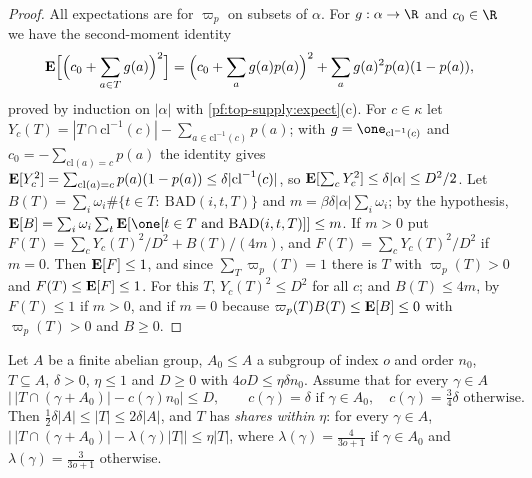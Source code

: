 \begin{proof}
All expectations are for $\varpi_p$ on subsets of $\alpha$. For $g:\alpha\to\R$ and $c_0\in\R$ we have the second-moment
identity
\[
\mathbf{E}\Big[\Big(c_0+\sum_{a\in T}g(a)\Big)^2\Big]=\Big(c_0+\sum_ag(a)p(a)\Big)^2+\sum_ag(a)^2p(a)(1-p(a)),
\]
proved by induction on $|\alpha|$ with \cref{pf:top-supply:expect}(c). For $c\in\kappa$ let
$Y_c(T)=|T\cap\mathrm{cl}^{-1}(c)|-\sum_{a\in\mathrm{cl}^{-1}(c)}p(a)$; with $g=\one_{\mathrm{cl}^{-1}(c)}$ and
$c_0=-\sum_{\mathrm{cl}(a)=c}p(a)$ the identity gives
$\mathbf{E}[Y_c^2]=\sum_{\mathrm{cl}(a)=c}p(a)(1-p(a))\le\delta|\mathrm{cl}^{-1}(c)|$, so
$\mathbf{E}[\sum_cY_c^2]\le\delta|\alpha|\le D^2/2$. Let $B(T)=\sum_i\omega_i\#\{t\in T:\ \mathrm{BAD}(i,t,T)\}$ and
$m=\beta\delta|\alpha|\sum_i\omega_i$; by the hypothesis, $\topsupplyE[B]=\sum_i\omega_i\sum_t\topsupplyE[\one[t\in T\text{ and }
\mathrm{BAD}(i,t,T)]]\le m$. If $m>0$ put $F(T)=\sum_cY_c(T)^2/D^2+B(T)/(4m)$, and $F(T)=\sum_cY_c(T)^2/D^2$ if $m=0$. Then
$\mathbf{E}[F]\le1$, and since $\sum_T\varpi_p(T)=1$ there is $T$ with $\varpi_p(T)>0$ and $F(T)\le\mathbf{E}[F]\le1$. For
this $T$, $Y_c(T)^2\le D^2$ for all $c$; and $B(T)\le4m$, by $F(T)\le1$ if $m>0$, and if $m=0$ because
$\varpi_p(T)B(T)\le\mathbf{E}[B]\le0$ with $\varpi_p(T)>0$ and $B\ge0$.
\end{proof}

\begin{lemma}\label{pf:top-supply:shares}
Let $A$ be a finite abelian group, $A_0\le A$ a subgroup of index $o$ and order $n_0$, $T\subseteq A$, $\delta>0$,
$\eta\le1$ and $D\ge0$ with $4oD\le\eta\delta n_0$. Assume that for every $\gamma\in A$
\[
\big|\,|T\cap(\gamma+A_0)|-c(\gamma)n_0\big|\le D,\qquad c(\gamma)=\delta\text{ if }\gamma\in A_0,\quad
c(\gamma)=\tfrac34\delta\text{ otherwise}.
\]
Then $\frac12\delta|A|\le|T|\le2\delta|A|$, and $T$ has \emph{shares within $\eta$}: for every $\gamma\in A$,
$\big|\,|T\cap(\gamma+A_0)|-\lambda(\gamma)|T|\big|\le\eta|T|$, where $\lambda(\gamma)=\frac4{3o+1}$ if $\gamma\in A_0$ and
$\lambda(\gamma)=\frac3{3o+1}$ otherwise.
 
\end{lemma}

